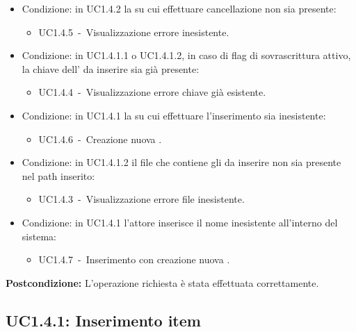 \documentclass{scalatekids-article}
\begin{document}
\begin{itemize}
\item Condizione: in UC1.4.2 la  su cui effettuare cancellazione non sia presente:
  \begin{itemize}
  \item UC1.4.5\ -\ Visualizzazione errore  inesistente.
  \end{itemize}
\item Condizione: in UC1.4.1.1 o UC1.4.1.2, in caso di flag di sovrascrittura attivo, la chiave dell' da inserire sia già presente:
  \begin{itemize}
  \item UC1.4.4\ -\ Visualizzazione errore chiave già esistente.
  \end{itemize}
\item Condizione: in UC1.4.1 la  su cui effettuare l'inserimento sia inesistente:
  \begin{itemize}
  \item UC1.4.6\ -\ Creazione nuova .
  \end{itemize}
\item Condizione: in UC1.4.1.2  il file che contiene gli  da inserire non sia presente nel path inserito:
  \begin{itemize}
  \item UC1.4.3\ -\ Visualizzazione errore file inesistente.
  \end{itemize}
\item Condizione: in UC1.4.1 l'attore inserisce il nome  inesistente all'interno del sistema:
  \begin{itemize}
  \item UC1.4.7\ -\ Inserimento con creazione nuova .
  \end{itemize}
\end{itemize}
\textbf{Postcondizione:} L'operazione richiesta è stata effettuata correttamente.

\subsection{UC1.4.1: Inserimento item}
\end{document}
